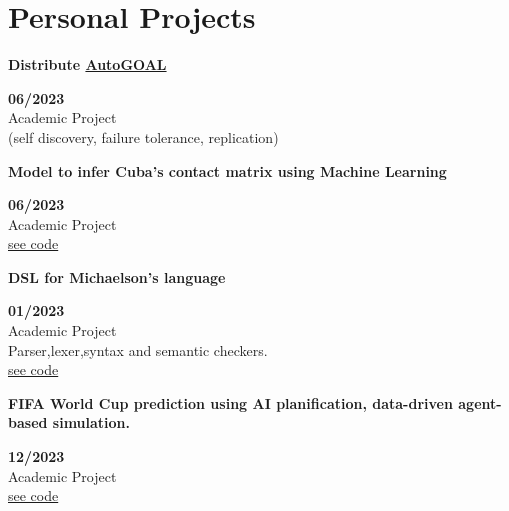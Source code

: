 \documentclass[a4paper,12pt]{article}
\begin{document}

\section*{Personal Projects}
\begin{minipage}{\textwidth}
\parbox{0.8\linewidth}{\textbf{Distribute \href{https://autogoal.github.io/}{AutoGOAL}}}\hfill \textbf{06/2023}\\
Academic Project\\
(self discovery, failure tolerance, replication)\\
\end{minipage}
\begin{minipage}{\textwidth}
\parbox{0.8\linewidth}{\textbf{Model to infer Cuba's contact matrix using Machine Learning}} \hfill \textbf{06/2023}\\
Academic Project\\
\href{https://github.com/geeksLabTech/epidemic-classification-ml-project}{see code}\\
\end{minipage}
\begin{minipage}{\textwidth}
\parbox{0.8\linewidth}{\textbf{DSL for Michaelson's language}} \hfill \textbf{01/2023}\\
Academic Project\\
Parser,lexer,syntax and semantic checkers.\\
\href{https://github.com/geeksLabTech/compilation-dsl-project}{see code}\\
\end{minipage}
\begin{minipage}{\textwidth}
\parbox{0.8\linewidth}{\textbf{FIFA World Cup prediction using AI planification, data-driven agent-based simulation.}}  \hfill  \textbf{12/2023}\\
Academic Project\\
\href{https://github.com/geeksLabTech/FIFA_World_Cup_2022}{see code}\\
\end{minipage}
\end{document}
